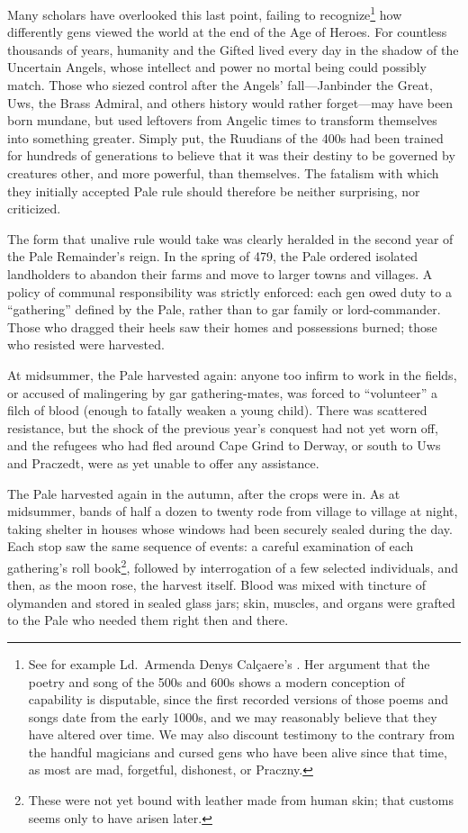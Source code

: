 \documentclass[12pt]{report}
\begin{document}
Many scholars have overlooked this last point, failing to
recognize\footnote{See for example Ld.\ Armenda Denys Cal\c{c}aere's
.  Her argument
that the poetry and song of the 500s and 600s shows a modern
conception of capability is disputable, since the first recorded
versions of those poems and songs date from the early 1000s, and we
may reasonably believe that they have altered over time.  We may also
discount testimony to the contrary from the handful magicians and
cursed gens who have been alive since that time, as most are mad,
forgetful, dishonest, or Praczny.} how differently gens viewed the
world at the end of the Age of Heroes.  For countless thousands of
years, humanity and the Gifted lived every day in the shadow of the
Uncertain Angels, whose intellect and power no mortal being could
possibly match.  Those who siezed control after the Angels'
fall---Janbinder the Great, Uws, the Brass Admiral, and others history
would rather forget---may have been born mundane, but used leftovers
from Angelic times to transform themselves into something greater.
Simply put, the Ruudians of the 400s had been trained for hundreds of
generations to believe that it was their destiny to be governed by
creatures other, and more powerful, than themselves.  The fatalism
with which they initially accepted Pale rule should therefore be
neither surprising, nor criticized.

The form that unalive rule would take was clearly heralded in the
second year of the Pale Remainder's reign.  In the spring of 479, the
Pale ordered isolated landholders to abandon their farms and move to
larger towns and villages.  A policy of communal responsibility was
strictly enforced: each gen owed duty to a ``gathering'' defined by the
Pale, rather than to gar family or lord-commander.  Those who dragged
their heels saw their homes and possessions burned; those who resisted
were harvested.

At midsummer, the Pale harvested again: anyone too infirm to work in
the fields, or accused of malingering by gar gathering-mates, was
forced to ``volunteer'' a filch of blood (enough to fatally weaken a
young child).  There was scattered resistance, but the shock of the
previous year's conquest had not yet worn off, and the refugees who
had fled around Cape Grind to Derway, or south to Uws and Praczedt,
were as yet unable to offer any assistance.

The Pale harvested again in the autumn, after the crops were in.  As
at midsummer, bands of half a dozen to twenty rode from village to
village at night, taking shelter in houses whose windows had been
securely sealed during the day.  Each stop saw the same sequence of
events: a careful examination of each gathering's roll
book\footnote{These were not yet bound with leather made from human
skin; that customs seems only to have arisen later.}, followed by
interrogation of a few selected individuals, and then, as the moon
rose, the harvest itself.  Blood was mixed with tincture of olymanden
and stored in sealed glass jars; skin, muscles, and organs were
grafted to the Pale who needed them right then and there.
\end{document}
